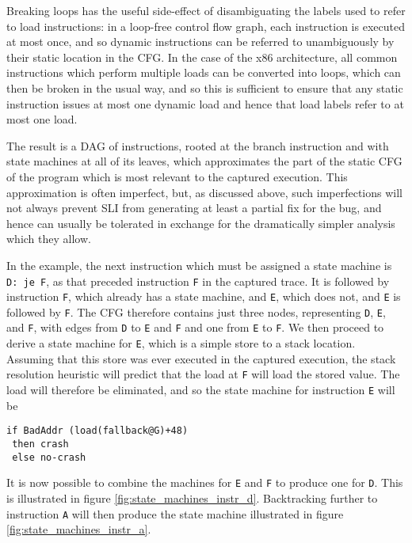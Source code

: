 \documentclass[10pt,twocolumn,preprint,natbib,authoryear]{sigplanconf}
\begin{document}
Breaking loops has the useful side-effect of disambiguating the labels
used to refer to load instructions: in a loop-free control flow graph,
each instruction is executed at most once, and so dynamic instructions
can be referred to unambiguously by their static location in the CFG.
In the case of the x86 architecture, all common instructions which
perform multiple loads can be converted into loops, which can then be
broken in the usual way, and so this is sufficient to ensure that any
static instruction issues at most one dynamic load and hence that load
labels refer to at most one load.

The result is a DAG of instructions, rooted at the branch instruction
and with state machines at all of its leaves, which approximates the
part of the static CFG of the program which is most relevant to the
captured execution.  This approximation is often imperfect, but, as
discussed above, such imperfections will not always prevent SLI from
generating at least a partial fix for the bug, and hence can usually
be tolerated in exchange for the dramatically simpler analysis which
they allow.



In the example, the next instruction which must be assigned a state
machine is \verb|D: je F|, as that preceded instruction \verb|F| in
the captured trace.  It is followed by instruction \verb|F|, which
already has a state machine, and \verb|E|, which does not, and
\verb|E| is followed by \verb|F|.  The CFG therefore contains just
three nodes, representing \verb|D|, \verb|E|, and \verb|F|, with edges
from \verb|D| to \verb|E| and \verb|F| and one from \verb|E| to
\verb|F|.  We then proceed to derive a state machine for \verb|E|,
which is a simple store to a stack location.  Assuming that this store
was ever executed in the captured execution, the stack resolution
heuristic will predict that the load at \verb|F| will load the stored
value.  The load will therefore be eliminated, and so the state
machine for instruction \verb|E| will be

\begin{verbatim}
if BadAddr (load(fallback@G)+48)
 then crash
 else no-crash
\end{verbatim}

\noindent
It is now possible to combine the machines for \verb|E| and \verb|F|
to produce one for \verb|D|.  This is illustrated in figure
\ref{fig:state_machines_instr_d}.  Backtracking further to instruction
\verb|A| will then produce the state machine illustrated in figure
\ref{fig:state_machines_instr_a}.
\end{document}
